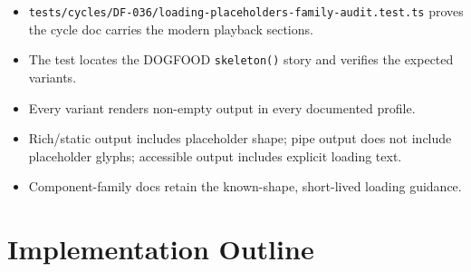 \begin{itemize}
\tightlist
\item
  \texttt{t\allowbreak{}e\allowbreak{}s\allowbreak{}t\allowbreak{}s\allowbreak{}/\allowbreak{}c\allowbreak{}y\allowbreak{}c\allowbreak{}l\allowbreak{}e\allowbreak{}s\allowbreak{}/\allowbreak{}D\allowbreak{}F\allowbreak{}-\allowbreak{}0\allowbreak{}3\allowbreak{}6\allowbreak{}/\allowbreak{}l\allowbreak{}o\allowbreak{}a\allowbreak{}d\allowbreak{}i\allowbreak{}n\allowbreak{}g\allowbreak{}-\allowbreak{}p\allowbreak{}l\allowbreak{}a\allowbreak{}c\allowbreak{}e\allowbreak{}h\allowbreak{}o\allowbreak{}l\allowbreak{}d\allowbreak{}e\allowbreak{}r\allowbreak{}s\allowbreak{}-\allowbreak{}f\allowbreak{}a\allowbreak{}m\allowbreak{}i\allowbreak{}l\allowbreak{}y\allowbreak{}-\allowbreak{}a\allowbreak{}u\allowbreak{}d\allowbreak{}i\allowbreak{}t\allowbreak{}.\allowbreak{}t\allowbreak{}e\allowbreak{}s\allowbreak{}t\allowbreak{}.\allowbreak{}t\allowbreak{}s} proves the cycle doc carries the modern playback sections.
\item
  The test locates the DOGFOOD \texttt{s\allowbreak{}k\allowbreak{}e\allowbreak{}l\allowbreak{}e\allowbreak{}t\allowbreak{}o\allowbreak{}n\allowbreak{}(\allowbreak{})} story and verifies the expected variants.
\item
  Every variant renders non-empty output in every documented profile.
\item
  Rich/static output includes placeholder shape; pipe output does not include placeholder glyphs; accessible output includes explicit loading text.
\item
  Component-family docs retain the known-shape, short-lived loading guidance.
\end{itemize}

\section{Implementation Outline}\label{record-093-implementation-outline}

